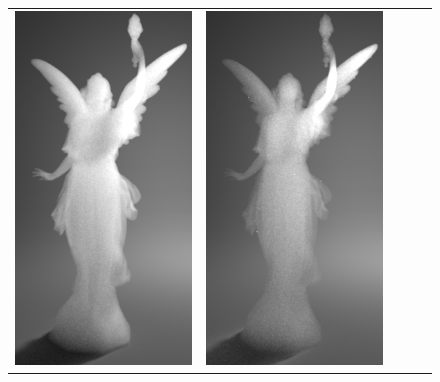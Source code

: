 \begin{figure}
\begin{tabular}{ccccc}
		\includegraphics[height=\resLen]{images/lucy/N100_300nm.jpg} &
		\includegraphics[height=\resLen]{images/lucy/N500_300nm.jpg}
		\\

\end{tabular}
\end{figure}
